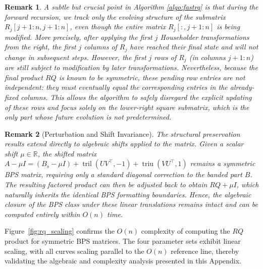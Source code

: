 \documentclass[a4paper,fleqn]{cas-sc}
\newtheorem{remark}{Remark}[section]
\DeclareMathOperator{\triu}{triu}
\DeclareMathOperator{\tril}{tril}
\begin{document}
\begin{remark}\label{rem:symmetric_tracking}
A subtle but crucial point in Algorithm \ref{algo:fastrq} is that during the forward recursion, we track only the evolving structure of the submatrix $R_{j}[j+1:n, j+1:n]$, even though the entire matrix $R_{j}[:, j+1:n]$ is being modified. More precisely, after applying the first $j$ Householder transformations from the right, the first $j$ columns of $R_{j}$ have reached their final state and will not change in subsequent steps.
However, the first $j$ rows of $R_{j}$ (in columns $j+1:n$) are still subject to modification by later transformations.
Nevertheless, because the final product $RQ$ is known to be symmetric, these pending row entries are not independent: they must eventually equal the corresponding entries in the already-fixed columns.
This allows the algorithm to safely disregard the explicit updating of these rows and focus solely on the lower-right square submatrix, which is the only part whose future evolution is not predetermined.
\end{remark}


\begin{remark}[Perturbation and Shift Invariance]
The structural preservation results extend directly to algebraic shifts applied to the matrix. Given a scalar shift $\mu \in \mathbb{R}$, the shifted matrix $A - \mu I = (B_s - \mu I) + \tril(UV^\top, -1) + \triu(VU^\top, 1)$ remains a symmetric BPS matrix, requiring only a standard diagonal correction to the banded part $B$. The resulting factored product can then be adjusted back to obtain $RQ + \mu I$, which naturally inherits the identical BPS formatting boundaries. Hence, the algebraic closure of the BPS class under these linear translations remains intact and can be computed entirely within $O(n)$ time.
\end{remark}

Figure~\ref{fig:rq_scaling} confirms the $O(n)$ complexity of computing the $RQ$ product for symmetric BPS matrices. The four parameter sets exhibit linear scaling, with all curves scaling parallel to the $O(n)$ reference line, thereby validating the algebraic and complexity analysis presented in this Appendix.
\end{document}
